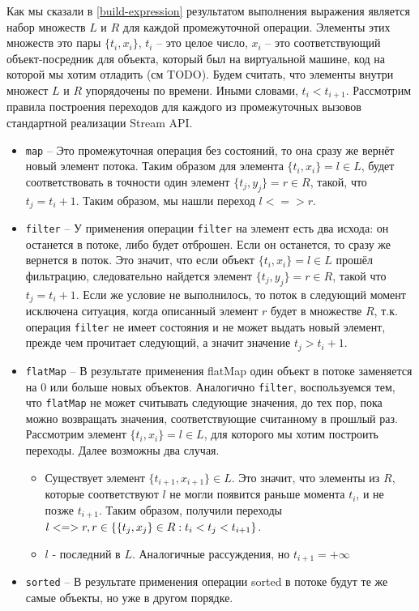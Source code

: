 Как мы сказали в \ref{build-expression} результатом выполнения выражения является набор множеств $L$ и $R$ для каждой промежуточной операции. Элементы этих множеств это пары $\{t_i, x_i\}$, $t_i$ -- это целое число, $x_i$ -- это соответствующий объект-посредник для объекта, который был на виртуальной машине, код на которой мы хотим отладить (см TODO). Будем считать, что элементы внутри множест $L$ и $R$ упорядочены по времени. Иными словами, $t_i < t_{i + 1}$. Рассмотрим правила построения переходов для каждого из промежуточных вызовов стандартной реализации Stream API.
\begin{itemize}
	\item \texttt{map} -- Это промежуточная операция без состояний, то она сразу же вернёт новый элемент потока. Таким образом для элемента $\{t_i, x_i\} = l \in L$, будет соответствовать в точности один элемент $\{t_j, y_j\} = r \in R$, такой, что $t_j = t_i + 1$. Таким образом, мы нашли переход $l <=> r$.
	\item \texttt{filter} -- У применения операции \texttt{filter} на элемент есть два исхода: он останется в потоке, либо будет отброшен. Если он останется, то сразу же вернется в поток. Это значит, что если объект $\{t_i, x_i\} = l \in L$ прошёл фильтрацию, следовательно найдется элемент $\{t_j, y_j\} = r \in R$, такой что $t_j = t_i + 1$. Если же условие не выполнилось, то поток в следующий момент исключена ситуация, когда описанный элемент $r$ будет в множестве $R$, т.к. операция \texttt{filter} не имеет состояния и не может выдать новый элемент, прежде чем прочитает следующий, а значит значение $t_j > t_i + 1$. 
	\item \texttt{flatMap} -- В результате применения flatMap один объект в потоке заменяется на 0 или больше новых объектов. Аналогично \texttt{filter}, воспользуемся тем, что \texttt{flatMap} не может считывать следующие значения, до тех пор, пока можно возвращать значения, соответствующие считанному в прошлый раз. Рассмотрим элемент $\{t_i, x_i\} = l \in L$, для которого мы хотим построить переходы. Далее возможны два случая.
	\begin{itemize}
		\item Существует элемент $\{t_{i + 1}, x_{i + 1}\} \in L$. Это значит, что элементы из $R$, которые соответствуют $l$ не могли появится раньше момента $t_i$, и не позже $t_{i + 1}$. Таким образом, получили переходы $l <=> r, \\ r \in \{\{t_j, x_j\} \in R : t_i < t_j < t_{i + 1}\}$.
		\item $l$ - последний в $L$. Аналогичные рассуждения, но $t_{i + 1} = +\infty$
	\end{itemize}
	\item \texttt{sorted} -- В результате применения операции sorted в потоке будут те же самые объекты, но уже в другом порядке. 
\end{itemize}

